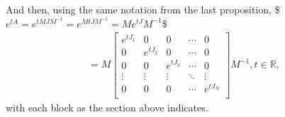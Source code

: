 \documentclass[letterpaper,10pt,english]{jupyterBook}
\begin{document}
\sphinxAtStartPar
And then, using the same notation from the last proposition,
\$\(
e^{tA} = e^{tMJM^{-1}} = e^{MtJM^{-1}} = Me^{tJ}M^{-1} 
\)\$
\begin{equation*}
\begin{split}
    = M \left[ { \begin{array}{ccccc}
        e^{tJ_1} & 0 & 0 & \dotsm & 0\\
        0 & e^{tJ_2} & 0 & \dotsm & 0\\
        0 & 0 & e^{tJ_3} & \dotsm & 0\\
        \vdots & \vdots & \vdots & \ddots & \vdots\\
        0 & 0 & 0 & \dotsm & e^{tJ_{N}}\\
    \end{array} } \right] M^{-1}, t \in \mathbb{R},
\end{split}
\end{equation*}
\sphinxAtStartPar
with each block as the section above indicates.







\renewcommand{\indexname}{Index}
\printindex
\end{document}

